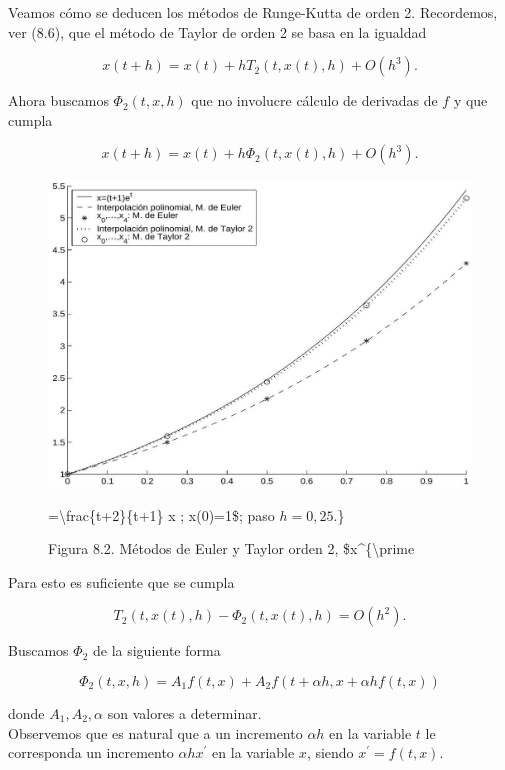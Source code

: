 \documentclass[10pt]{book}
\begin{document}
Veamos cómo se deducen los métodos de Runge-Kutta de orden 2. Recordemos, ver (8.6), que el método de Taylor de orden 2 se basa en la igualdad

$$
x(t+h)=x(t)+h T_{2}(t, x(t), h)+O\left(h^{3}\right) .
$$

Ahora buscamos $\Phi_{2}(t, x, h)$ que no involucre cálculo de derivadas de $f$ y que cumpla

$$
x(t+h)=x(t)+h \Phi_{2}(t, x(t), h)+O\left(h^{3}\right) .
$$

\begin{figure}[h]
\begin{center}
  \includegraphics[width=\textwidth]{2025_09_05_3888c9ac96bd653d96b4g-179}
\captionsetup{labelformat=empty}
\caption{Figura 8.2. Métodos de Euler y Taylor orden 2, \$x\^{}\{\textbackslash prime}=\textbackslash frac\{t+2\}\{t+1\} x ; x(0)=1\$; paso $h=0,25$.\}\end{center}
\end{figure}

Para esto es suficiente que se cumpla


\begin{equation*}
T_{2}(t, x(t), h)-\Phi_{2}(t, x(t), h)=O\left(h^{2}\right) . \tag{8.9}
\end{equation*}


Buscamos $\Phi_{2}$ de la siguiente forma


\begin{equation*}
\Phi_{2}(t, x, h)=A_{1} f(t, x)+A_{2} f(t+\alpha h, x+\alpha h f(t, x)) \tag{8.10}
\end{equation*}


donde $A_{1}, A_{2}, \alpha$ son valores a determinar.\\
Observemos que es natural que a un incremento $\alpha h$ en la variable $t$ le corresponda un incremento $\alpha h x^{\prime}$ en la variable $x$, siendo $x^{\prime}=f(t, x)$.
\end{document}
